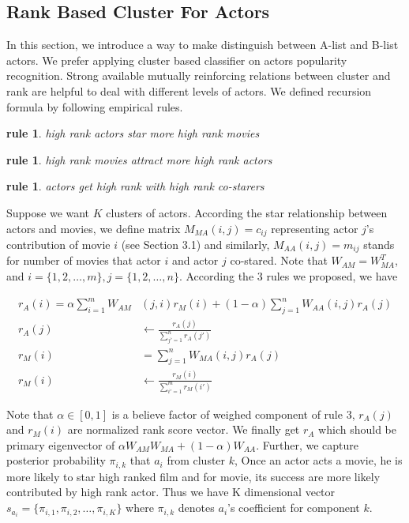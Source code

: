 \subsection{Rank Based Cluster For Actors}
In this section, we introduce a way \cite{sun2009rankclus:} to make distinguish between A-list and B-list actors. We prefer applying cluster based classifier on actors popularity recognition. Strong available mutually reinforcing relations between cluster and rank are helpful to deal with different levels of actors. We defined recursion formula by following empirical rules.
\newtheorem{rules}[theorem]{rule}
\begin{rules} high rank actors star more high rank movies\end{rules}
\begin{rules} high rank movies attract more high rank actors\end{rules}
\begin{rules} actors get high rank with high rank co-starers\end{rules}

Suppose we want $K$ clusters of actors. According the star relationship between actors and movies, we define matrix $M_{MA}(i, j)=c_{ij}$ representing actor $j$'s contribution of movie $i$ (see Section 3.1) and similarly, $M_{AA}(i, j)= m_{ij}$ stands for number of movies that actor $i$ and actor $j$ co-stared. Note that $W_{AM} = W_{MA}^T$, and $i=\{1,2,\dots, m\}, j=\{1,2,\dots, n\}$. According the 3 rules we proposed, we have

\begin{subequations}
\begin{align}
  r_{A}(i) = \alpha \sum_{i=1}^{m}W_{AM}&(j, i)r_M(i) + (1-\alpha)\sum_{j=1}^{n}W_{AA}(i, j)r_A(j)\\
  r_{A}(j) &\leftarrow \frac{r_{A}(j)}{\sum_{j'=1}^{n}r_{A}(j')}\\
  r_{M}(i) &= \sum_{j=1}^{n}W_{MA}(i, j)r_A(j)\\
  r_{M}(i) &\leftarrow \frac{r_{M}(i)}{\sum_{i'=1}^{m}r_{M}(i')}
\end{align}
\end{subequations}

Note that $\alpha \in [0,1]$ is a believe factor of weighed component of rule 3,  $r_{A}(j)$ and $r_{M}(i)$ are normalized rank score vector. We finally get $r_A$ which should be primary eigenvector of $\alpha W_{AM}W_{MA} + (1-\alpha) W_{AA}$. Further, we capture posterior probability $\pi_{i,k}$ that $a_i$ from cluster $k$, Once an actor acts a movie, he is more likely to star high ranked film and for movie, its success are more likely contributed by high rank actor. Thus we have K dimensional vector $s_{a_i} = \{\pi_{i,1}, \pi_{i,2}, \dots, \pi_{i,K}\}$ where $\pi_{i,k}$ denotes $a_i$'s coefficient for component $k$.

